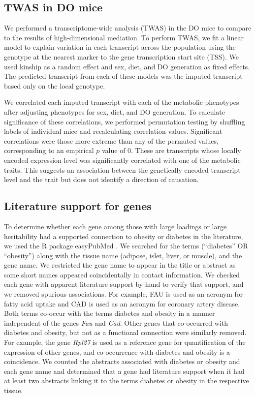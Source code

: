 \documentclass[
]{article}
\begin{document}
\subsection{TWAS in DO mice}\label{twas-in-do-mice}

We performed a transcriptome-wide analysis (TWAS) \cite{pmid26258848, 
pmid26854917} in the DO mice to compare to the results of
high-dimensional mediation. To perform TWAS, we fit a linear model to
explain variation in each transcript across the population using the
genotype at the nearest marker to the gene transcription start site
(TSS). We used kinship as a random effect and sex, diet, and DO
generation as fixed effects. The predicted transcript from each of these
models was the imputed transcript based only on the local genotype.

We correlated each imputed transcript with each of the metabolic
phenotypes after adjusting phenotypes for sex, diet, and DO generation.
To calculate significance of these correlations, we performed
permutation testing by shuffling labels of individual mice and
recalculating correlation values. Significant correlations were those
more extreme than any of the permuted values, corresponding to an
empirical \(p\) value of 0. These are transcripts whose locally encoded
expression level was significantly correlated with one of the metabolic
traits. This suggests an association between the genetically encoded
transcript level and the trait but does not identify a direction of
causation.

\subsection{Literature support for
genes}\label{literature-support-for-genes}

To determine whether each gene among those with large loadings or large
heritability had a supported connection to obesity or diabetes in the
literature, we used the R package easyPubMed \cite{easyPubMed}. We
searched for the terms (``diabetes'' OR ``obesity'') along with the
tissue name (adipose, islet, liver, or muscle), and the gene name. We
restricted the gene name to appear in the title or abstract as some
short names appeared coincidentally in contact information. We checked
each gene with apparent literature support by hand to verify that
support, and we removed spurious associations. For example, FAU is used
as an acronym for fatty acid uptake and CAD is used as an acronym for
coronary artery disease. Both terms co-occur with the terms diabetes and
obesity in a manner independent of the genes \textit{Fau} and
\textit{Cad}. Other genes that co-occurred with diabetes and obesity,
but not as a functional connection were similarly removed. For example,
the gene \textit{Rpl27} is used as a reference gene for quantification
of the expression of other genes, and co-occurrence with diabetes and
obesity is a coincidence. We counted the abstracts associated with
diabetes or obesity and each gene name and determined that a gene had
literature support when it had at least two abstracts linking it to the
terms diabetes or obesity in the respective tissue.
\end{document}
